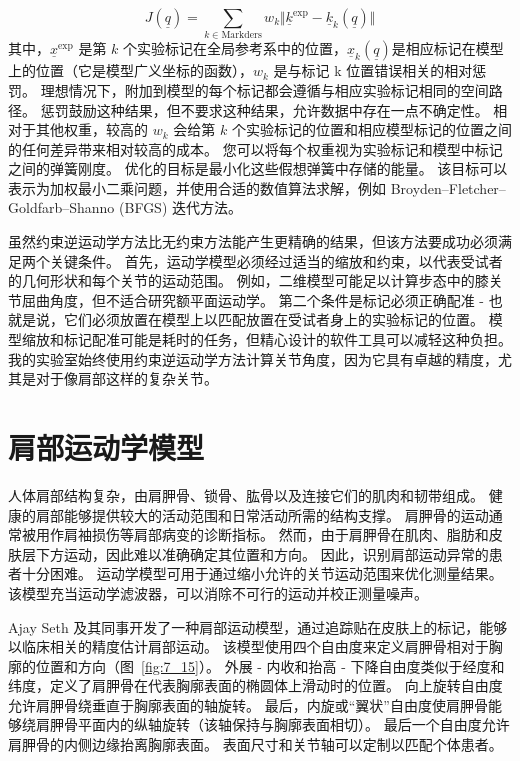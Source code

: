 \begin{equation}
	J(\underline{q}) = 
		\sum_{k \in \text{Markders}} 
		w_k
		\Vert \underline{k}^\text{exp} - \underline{k}_k (\underline{q}) \Vert
	\label{eq:7_16}
\end{equation}
%
其中，$\underline{x}^\text{exp}$ 是第 $k$ 个实验标记在全局参考系中的位置，$\underline{x}_k (\underline{q})$是相应标记在模型上的位置（它是模型广义坐标的函数），$w_k$ 是与标记 k 位置错误相关的相对惩罚。
理想情况下，附加到模型的每个标记都会遵循与相应实验标记相同的空间路径。
惩罚鼓励这种结果，但不要求这种结果，允许数据中存在一点不确定性。
相对于其他权重，较高的 $w_k$ 会给第 $k$ 个实验标记的位置和相应模型标记的位置之间的任何差异带来相对较高的成本。
您可以将每个权重视为实验标记和模型中标记之间的弹簧刚度。
优化的目标是最小化这些假想弹簧中存储的能量。
该目标可以表示为加权最小二乘问题，并使用合适的数值算法求解，例如 Broyden–Fletcher–Goldfarb–Shanno (BFGS) 迭代方法\cite{wright2006numerical}。


虽然约束逆运动学方法比无约束方法能产生更精确的结果，但该方法要成功必须满足两个关键条件。
首先，运动学模型必须经过适当的缩放和约束，以代表受试者的几何形状和每个关节的运动范围。
例如，二维模型可能足以计算步态中的膝关节屈曲角度，但不适合研究额平面运动学。
第二个条件是标记必须正确配准 - 也就是说，它们必须放置在模型上以匹配放置在受试者身上的实验标记的位置。
模型缩放和标记配准可能是耗时的任务，但精心设计的软件工具可以减轻这种负担。
我的实验室始终使用约束逆运动学方法计算关节角度，因为它具有卓越的精度，尤其是对于像肩部这样的复杂关节。



\section{肩部运动学模型}

人体肩部结构复杂，由肩胛骨、锁骨、肱骨以及连接它们的肌肉和韧带组成。
健康的肩部能够提供较大的活动范围和日常活动所需的结构支撑。
肩胛骨的运动通常被用作肩袖损伤等肩部病变的诊断指标。
然而，由于肩胛骨在肌肉、脂肪和皮肤层下方运动，因此难以准确确定其位置和方向。
因此，识别肩部运动异常的患者十分困难。
运动学模型可用于通过缩小允许的关节运动范围来优化测量结果。
该模型充当运动学滤波器，可以消除不可行的运动并校正测量噪声。


Ajay Seth 及其同事开发了一种肩部运动模型，通过追踪贴在皮肤上的标记，能够以临床相关的精度估计肩部运动。
该模型使用四个自由度来定义肩胛骨相对于胸廓的位置和方向（图~\ref{fig:7_15}）。
外展 - 内收和抬高 - 下降自由度类似于经度和纬度，定义了肩胛骨在代表胸廓表面的椭圆体上滑动时的位置。
向上旋转自由度允许肩胛骨绕垂直于胸廓表面的轴旋转。
最后，内旋或“翼状”自由度使肩胛骨能够绕肩胛骨平面内的纵轴旋转（该轴保持与胸廓表面相切）。
最后一个自由度允许肩胛骨的内侧边缘抬离胸廓表面。
表面尺寸和关节轴可以定制以匹配个体患者。



